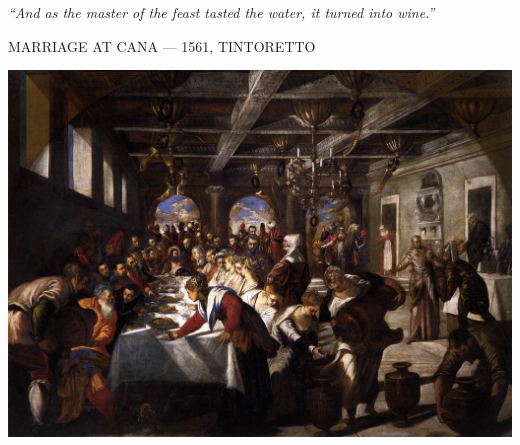 \begin{pages}
\begin{Leftside}
		\pend
        \endnumbering
    \end{Leftside}

\end{pages} 
\Pages

\clearpage
\thispagestyle{empty}
\null\vfill
\settowidth{}
\begin{center}
\parbox{\longest}{%
  \raggedright{\huge\itshape%
    ``And as the master of the feast tasted the water, it turned into wine.'' \par\bigskip
  }
  \raggedleft\Large\MakeUppercase{Marriage at Cana — 1561, Tintoretto}\par%
}
\vfill\vfill
\clearpage\newpage
\end{center}
\newpage
\thispagestyle{empty}
\begin{center}
	\includegraphics[angle=90, width=1\textwidth]{images/illustrations/tintorettomarriage.jpeg}
\end{center}
\vfill\vfill